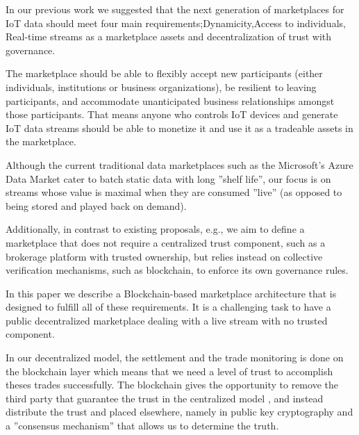 \documentclass[letterpaper, 10 pt, conference]{ieeeconf}  %
\begin{document}
In our previous work\cite{Missier2017} we suggested that the next generation of marketplaces for IoT data  should meet four main requirements;Dynamicity,Access to individuals, Real-time streams as a marketplace assets and decentralization of trust with governance.

 The marketplace should be able to flexibly accept new participants (either individuals, institutions or business organizations), be resilient to leaving participants, and accommodate unanticipated business relationships amongst those participants. That means anyone who controls IoT devices and generate IoT data streams should be able to monetize it and use it as a tradeable assets in the marketplace.
 
Although the current traditional data marketplaces such as the Microsoft's Azure Data Market \cite{22} cater to batch static data with long ''shelf life'', our focus is on streams whose value is maximal when they are consumed ''live'' (as opposed to being stored and played back on demand).

Additionally, in contrast to existing proposals, e.g.\cite{Cao:2016:MMR:2926746.2883611}, we aim to define a marketplace that does not require a centralized trust component, such as a brokerage platform with trusted ownership, but relies instead on collective verification mechanisms, such as blockchain, to enforce its own governance rules.

In this paper we describe a Blockchain-based marketplace architecture that is designed to fulfill all of these requirements. It is a challenging task to have a public decentralized marketplace dealing with a live stream with no trusted component.



 In our decentralized model, the settlement and the trade monitoring is done on the blockchain layer which means that we need a level of trust to accomplish theses trades successfully. The blockchain gives the opportunity to remove the third party that guarantee the trust in the centralized model , and instead distribute the trust and placed elsewhere, namely in public key cryptography and a ''consensus mechanism'' that allows us to determine the truth.
\end{document}
